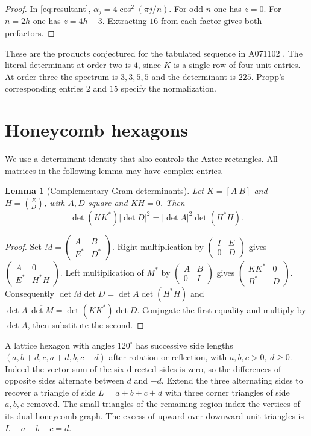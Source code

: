 \documentclass[11pt,letterpaper]{article}
\newtheorem{lemma}[theorem]{Lemma}
\begin{document}
\begin{proof}
In \eqref{eq:resultant}, \(\alpha_j=4\cos^2(\pi j/n)\). For odd \(n\) one has \(z=0\). For \(n=2h\) one has \(z=4h-3\). Extracting \(16\) from each factor gives both prefactors.
\end{proof}
These are the products conjectured for the tabulated sequence in A071102 \cite{oeis}. The literal determinant at order two is \(4\), since \(K\) is a single row of four unit entries. At order three the spectrum is \(3,3,5,5\) and the determinant is \(225\). Propp's corresponding entries \(2\) and \(15\) specify the normalization.

\clearpage
\section{Honeycomb hexagons}
We use a determinant identity that also controls the Aztec rectangles. All matrices in the following lemma may have complex entries.
\begin{lemma}[Complementary Gram determinants]\label{lem:complement}
Let \(K=[A\ B]\) and \(H=\binom{E}{D}\), with \(A,D\) square and \(KH=0\). Then
\[
 \det(KK^*)|\det D|^2=|\det A|^2\det(H^*H).
\]
\end{lemma}
\begin{proof}
Set \(M=\left(\begin{smallmatrix}A&B\\E^*&D^*\end{smallmatrix}\right)\).
Right multiplication by \(\left(\begin{smallmatrix}I&E\\0&D\end{smallmatrix}\right)\) gives
\(\left(\begin{smallmatrix}A&0\\E^*&H^*H\end{smallmatrix}\right)\).
Left multiplication of \(M^*\) by \(\left(\begin{smallmatrix}A&B\\0&I\end{smallmatrix}\right)\) gives
\(\left(\begin{smallmatrix}KK^*&0\\B^*&D\end{smallmatrix}\right)\).
Consequently \(\det M\det D=\det A\det(H^*H)\) and
\(\det A\,\overline{\det M}=\det(KK^*)\det D\). Conjugate the first equality and multiply by \(\det A\), then substitute the second.
\end{proof}
A lattice hexagon with angles \(120^\circ\) has successive side lengths
\((a,b+d,c,a+d,b,c+d)\) after rotation or reflection, with \(a,b,c>0,\ d\ge0\). Indeed the vector sum of the six directed sides is zero, so the differences of opposite sides alternate between \(d\) and \(-d\). Extend the three alternating sides to recover a triangle of side \(L=a+b+c+d\) with three corner triangles of side \(a,b,c\) removed. The small triangles of the remaining region index the vertices of its dual honeycomb graph. The excess of upward over downward unit triangles is \(L-a-b-c=d\).
\end{document}
